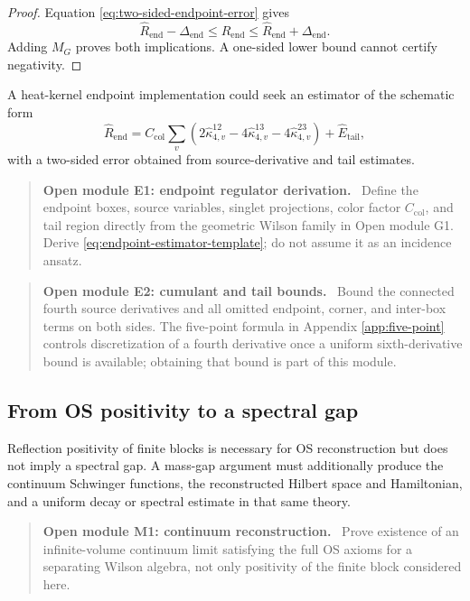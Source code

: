 \documentclass[11pt]{article}
\newenvironment{openmodule}[1]
{\begin{quote}\color{red!55!black}\textbf{Open module #1.}\ }
{\end{quote}}
\begin{document}
\begin{proof}
Equation \eqref{eq:two-sided-endpoint-error} gives
\[
  \widehat R_{\mathrm{end}}-\Delta_{\mathrm{end}}
  \le R_{\mathrm{end}}
  \le\widehat R_{\mathrm{end}}+\Delta_{\mathrm{end}}.
\]
Adding $M_G$ proves both implications.  A one-sided lower bound cannot certify negativity.
\end{proof}

A heat-kernel endpoint implementation could seek an estimator of the schematic form
\begin{equation}
  \widehat R_{\mathrm{end}}
  =C_{\mathrm{col}}
  \sum_v\left(
  2\widehat\kappa_{4,v}^{12}
  -4\widehat\kappa_{4,v}^{13}
  -4\widehat\kappa_{4,v}^{23}
  \right)
  +\widehat E_{\mathrm{tail}},
  \label{eq:endpoint-estimator-template}
\end{equation}
with a two-sided error obtained from source-derivative and tail estimates.

\begin{openmodule}{E1: endpoint regulator derivation}
Define the endpoint boxes, source variables, singlet projections, color factor $C_{\mathrm{col}}$, and tail region directly from the geometric Wilson family in Open module G1.  Derive \eqref{eq:endpoint-estimator-template}; do not assume it as an incidence ansatz.
\end{openmodule}

\begin{openmodule}{E2: cumulant and tail bounds}
Bound the connected fourth source derivatives and all omitted endpoint, corner, and inter-box terms on both sides.  The five-point formula in Appendix \ref{app:five-point} controls discretization of a fourth derivative once a uniform sixth-derivative bound is available; obtaining that bound is part of this module.
\end{openmodule}

\subsection{From OS positivity to a spectral gap}

Reflection positivity of finite blocks is necessary for OS reconstruction but does not imply a spectral gap.  A mass-gap argument must additionally produce the continuum Schwinger functions, the reconstructed Hilbert space and Hamiltonian, and a uniform decay or spectral estimate in that same theory.

\begin{openmodule}{M1: continuum reconstruction}
Prove existence of an infinite-volume continuum limit satisfying the full OS axioms for a separating Wilson algebra, not only positivity of the finite block considered here.
\end{openmodule}
\end{document}
